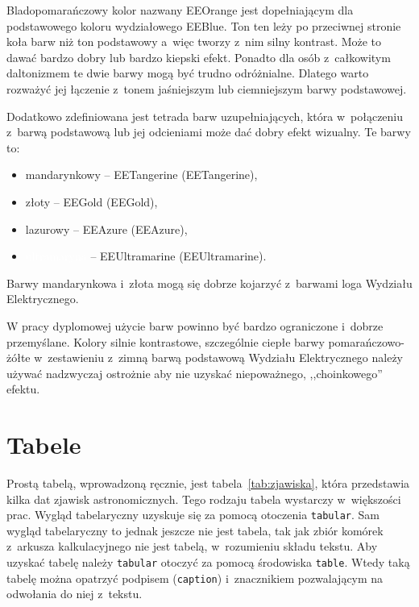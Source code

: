 Bladopomarańczowy kolor nazwany \textcolor{EEOrange}{EEOrange} jest dopełniającym dla podstawowego koloru wydziałowego EEBlue. Ton ten leży po przeciwnej stronie koła barw niż ton podstawowy a~więc tworzy z~nim silny kontrast. Może to dawać bardzo dobry lub bardzo kiepski efekt. Ponadto dla osób z~całkowitym daltonizmem te dwie barwy mogą być trudno odróżnialne. Dlatego warto rozważyć jej łączenie z~tonem jaśniejszym lub ciemniejszym barwy podstawowej.

Dodatkowo zdefiniowana jest tetrada barw uzupełniających, która w~połączeniu z~barwą podstawową lub jej odcieniami może dać dobry efekt wizualny. Te barwy to:
\begin{itemize}
    \item \colorbox{EETangerine}{mandarynkowy} -- \textcolor{EETangerine}{EETangerine} (EETangerine),
    \item \colorbox{EEGold}{złoty} --  \textcolor{EEGold}{EEGold} (EEGold),
    \item \colorbox{EEAzure}{lazurowy} --  \textcolor{EEAzure}{EEAzure} (EEAzure),
    \item \colorbox{EEUltramarine}{\textcolor{white}{ultramaryna}} --  \textcolor{EEUltramarine}{EEUltramarine} (EEUltramarine).
\end{itemize}
Barwy mandarynkowa i~złota mogą się dobrze kojarzyć z~barwami loga Wydziału Elektrycznego.

W pracy dyplomowej użycie barw powinno być bardzo ograniczone i~dobrze przemyślane. Kolory silnie kontrastowe, szczególnie ciepłe barwy pomarańczowo-żółte w~zestawieniu z~zimną barwą podstawową Wydziału Elektrycznego należy używać nadzwyczaj ostrożnie aby nie uzyskać niepoważnego, ,,choinkowego'' efektu.

\section{Tabele}
Prostą tabelą, wprowadzoną ręcznie, jest tabela~\ref{tab:zjawiska}, która przedstawia kilka dat zjawisk astronomicznych. Tego rodzaju tabela wystarczy w~większości prac. Wygląd tabelaryczny uzyskuje się za pomocą otoczenia \texttt{tabular}. Sam wygląd tabelaryczny to jednak jeszcze nie jest tabela, tak jak zbiór komórek z~arkusza kalkulacyjnego nie jest tabelą, w~rozumieniu składu tekstu. Aby uzyskać tabelę należy \texttt{tabular} otoczyć za pomocą środowiska \texttt{table}. Wtedy taką tabelę można opatrzyć podpisem (\texttt{caption}) i~znacznikiem pozwalającym na odwołania do niej z~tekstu.

